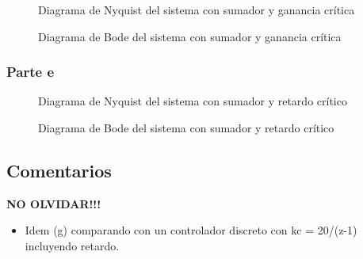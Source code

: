 \begin{figure}[h]
  \centering
  
  \caption{Diagrama de Nyquist del sistema con sumador y ganancia crítica}
  \label{fig:nyquist-h2}
\end{figure}

\begin{figure}[h]
  \centering
  
  \caption{Diagrama de Bode del sistema con sumador y ganancia crítica}
  \label{fig:bode-h2}
\end{figure}

\subsubsection{Parte e}

\begin{figure}[h]
  \centering
  
  \caption{Diagrama de Nyquist del sistema con sumador y retardo crítico}
  \label{fig:nyquist-h3}
\end{figure}

\begin{figure}[h]
  \centering
  
  \caption{Diagrama de Bode del sistema con sumador y retardo crítico}
  \label{fig:bode-h3}
\end{figure}


\FloatBarrier
\subsection{Comentarios}

\textbf{NO OLVIDAR!!!}


\begin{itemize}
  \item Idem (g) comparando con un controlador discreto con kc = 20/(z-1) incluyendo retardo.
\end{itemize}
